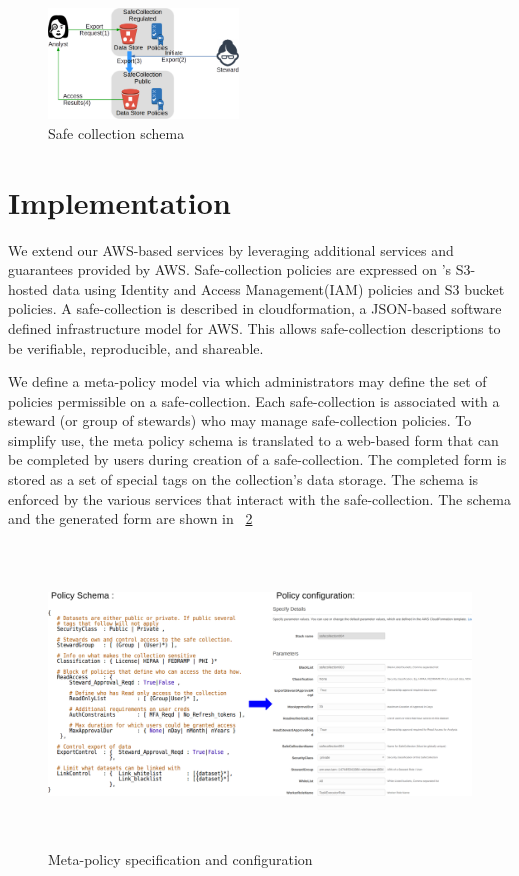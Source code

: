 \begin{figure}
  \center
  \includegraphics[width=0.45\textwidth]{figures/export_flow.png}
  \caption{Safe collection schema}
  \label{fig:flow2}
  \vspace{-1.5em}
\end{figure}



\section{Implementation}

We extend our AWS-based \NAME services by leveraging additional
services and guarantees provided by AWS. 
Safe-collection policies are expressed on \NAMENS's S3-hosted data
using Identity and Access Management(IAM) policies and S3 bucket policies.
A safe-collection is described in cloudformation, a JSON-based software defined infrastructure model for AWS.
This allows safe-collection descriptions to be verifiable, reproducible, and shareable.

We define a meta-policy model via which administrators may define
the set of policies permissible on a safe-collection. Each safe-collection is associated with a steward
(or group of stewards) who may manage safe-collection policies. To simplify use, the meta policy schema 
is translated to a web-based form that can be completed by users during creation of a safe-collection. 
The completed form is stored as a set of special tags on the collection's data storage. The schema is enforced
by the various services that interact with the safe-collection. The schema and the generated form are shown in
\figurename~\ref{fig:schema}

\begin{figure}[ht]
  \center
  \includegraphics[width=\textwidth, height=8cm]{figures/meta-policy.png}
  \caption{Meta-policy specification and configuration}
  \vspace{-1.5em}
  \label{fig:schema}
\end{figure}

